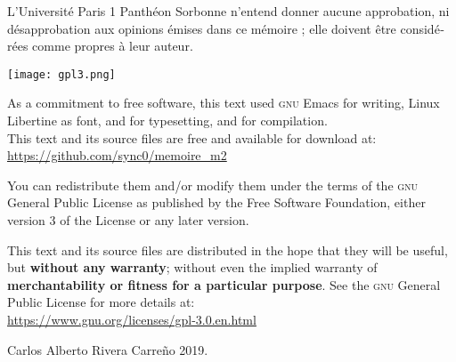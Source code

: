 \documentclass[version=last,draft=false,paper=A4,portrait,twoside=true,twocolumn=false,headinclude=false,footinclude=false,fontsize=12,BCOR=20mm,DIV=calc,pagesize=auto,titlepage=firstiscover,mpinclude=false,open=right,chapterprefix=true,numbers=autoendperiod,headsepline=false,headings=twolinechapter,parskip=false]{scrbook}
\begin{document}
\begin{french}
L'Université Paris 1 Panthéon Sorbonne n'entend donner aucune approbation,
ni désapprobation aux opinions émises dans ce mémoire ; elle doivent être
considérées comme propres à leur auteur. 
\end{french}
\vfill

\newpage
\begin{center}
\vspace*{\fill}
\noindent
\texttt{[image: gpl3.png]}\par
\vspace{1\baselineskip}

As a commitment to free software, this text used  \textsc{gnu}
Emacs for writing, Linux Libertine as font,  \hologo{\fmtname}
and \KOMAScript for typesetting, and   for compilation.\\
\vspace{1\baselineskip}
This text and its source files are free and available for download at:\\
\vspace{1\baselineskip}
\url{https://github.com/sync0/memoire_m2}
\vspace{1\baselineskip}

\noindent You can redistribute them and/or modify them under the terms of
the \textsc{gnu} General Public License as published by the Free Software
Foundation, either version 3 of the License or any later version.

This text and its source files are distributed in the hope that they will
be useful, but \textbf{without any warranty}; without even the implied
warranty of \textbf{merchantability or fitness for a particular purpose}.
See the \textsc{gnu} General Public License for more details at:\\ 
\vspace{1\baselineskip}
\url{https://www.gnu.org/licenses/gpl-3.0.en.html} 

\vspace{1\baselineskip}
\noindent
\textcopyright Carlos Alberto Rivera Carreño 2019.
\end{center}



\end{document}
